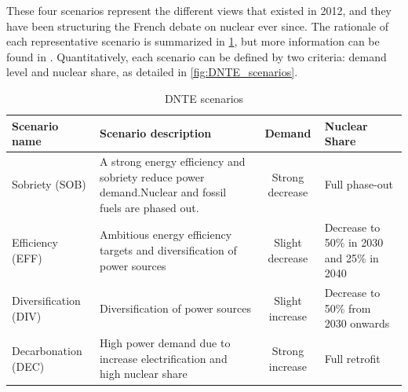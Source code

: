 These four scenarios represent the different views that existed in 2012, and they have been structuring the French debate on nuclear ever since. The rationale of each representative scenario is summarized in \cref{tab:dnteScenarios}, but more information can be found in \citet{DNTE_gt2}.
Quantitatively, each scenario can be defined by two criteria: demand level and nuclear share, as detailed in \cref{fig:DNTE_scenarios}.

\begin{table}
	\begin{tabular}{p{2cm}p{6cm}cp{2.5cm}}
		\toprule
		Scenario name & Scenario description & Demand & Nuclear Share \\
		\midrule
		Sobriety (SOB)     	& A strong energy efficiency and sobriety reduce power demand.\newline Nuclear and fossil fuels are phased out. & Strong decrease & Full phase-out \\
		Efficiency (EFF)  	 & Ambitious energy efficiency targets and diversification of power sources & Slight decrease & Decrease to 50\% in 2030 and 25\% in 2040 \\
		Diversification (DIV) 	& Diversification of power sources & Slight increase & Decrease to 50\% from 2030 onwards \\
		Decarbonation (DEC)  & High power demand due to increase electrification and high nuclear share & Strong increase & Full retrofit \\
		\bottomrule
	\end{tabular}
	\caption{\label{tab:dnteScenarios}DNTE scenarios}
\end{table}


